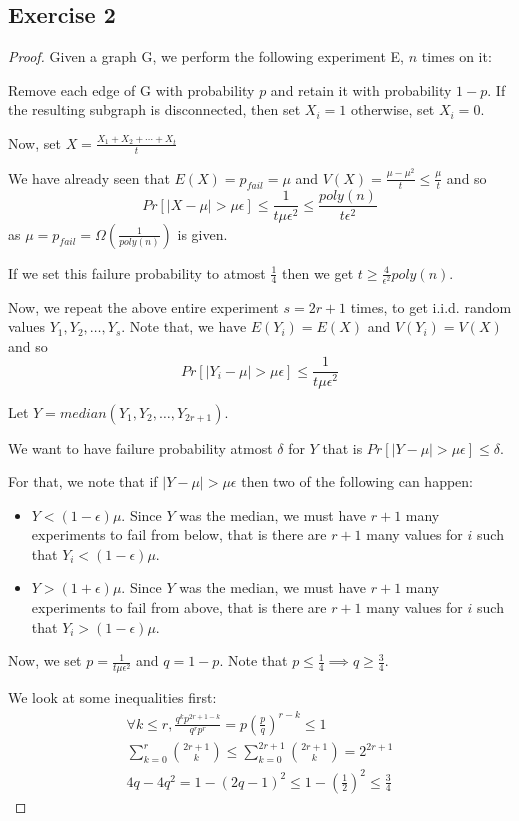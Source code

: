 \documentclass[12pt]{article}
\begin{document}
\subsection*{Exercise 2}
\begin{proof}
Given a graph G, we perform the following experiment E, $n$ times on it:

Remove each edge of G with probability $p$ and retain it with probability $1-p$. If the resulting subgraph is disconnected, then set $X_i = 1$ otherwise, set $X_i = 0$.

Now, set $X = \frac{X_1+X_2+\cdots+X_t}{t}$

We have already seen that $E(X) = p_{fail} = \mu$ and $V(X) = \frac{\mu - \mu^2}{t} \leq \frac{\mu}{t}$ and so
$$Pr[|X-\mu|>\mu \epsilon] \leq \frac{1}{t\mu \epsilon^2} \leq \frac{poly(n)}{t \epsilon^2}$$
as $\mu = p_{fail} = \Omega\left(\frac{1}{poly(n)}\right)$ is given.

If we set this failure probability to atmost $\frac{1}{4}$ then we get $t \geq \frac{4}{\epsilon^2}poly(n)$.

Now, we repeat the above entire experiment $s = 2r+1$ times, to get i.i.d. random values $Y_1, Y_2, \ldots, Y_{s}$. Note that, we have $E(Y_i) = E(X)$ and $V(Y_i) = V(X)$ and so
$$Pr[|Y_i-\mu|>\mu \epsilon] \leq \frac{1}{t\mu \epsilon^2}$$

Let $Y = median(Y_1, Y_2, \ldots, Y_{2r+1})$.

We want to have failure probability atmost $\delta$ for $Y$ that is $Pr[|Y-\mu| > \mu \epsilon] \leq \delta$.

For that, we note that if $|Y-\mu| > \mu \epsilon$ then two of the following can happen:
\begin{itemize}
    \item $Y < (1-\epsilon)\mu$. Since $Y$ was the median, we must have $r+1$ many experiments to fail from below, that is there are $r+1$ many values for $i$ such that $Y_i < (1-\epsilon)\mu$.
    \item $Y > (1+\epsilon)\mu$. Since $Y$ was the median, we must have $r+1$ many experiments to fail from above, that is there are $r+1$ many values for $i$ such that $Y_i > (1-\epsilon)\mu$.
\end{itemize}

Now, we set $p = \frac{1}{t\mu\epsilon^2}$ and $q = 1-p$. Note that $p \leq \frac{1}{4} \implies q \geq \frac{3}{4}$. 

We look at some inequalities first:
\begin{align}
    \forall k \leq r, \frac{q^kp^{2r+1-k}}{q^rp^r} = p\left(\frac{p}{q}\right)^{r-k} \leq 1  \\
    \sum_{k=0}^{r} {2r+1 \choose k} \leq \sum_{k=0}^{2r+1} {2r+1 \choose k} = 2^{2r+1} \\
    4q-4q^2 = 1 - (2q-1)^2 \leq 1 - \left(\frac{1}{2}\right)^2 \leq \frac{3}{4}
\end{align}


\end{proof}
\end{document}
